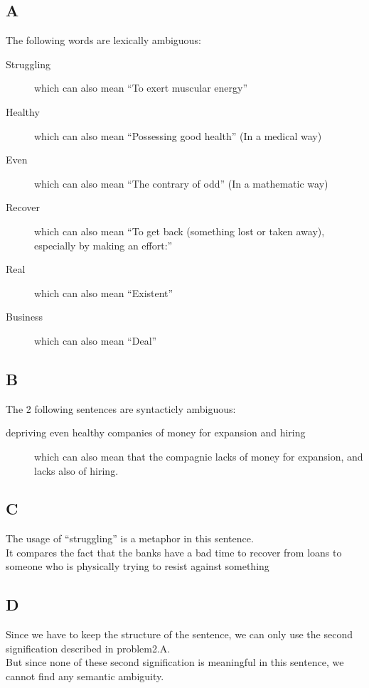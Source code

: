 \documentclass{article}
\begin{document}
        \subsection{A}
            The following words are lexically ambiguous:
            \begin{description}
                \item[Struggling] which can also mean ``To exert muscular energy''
                \item[Healthy] which can also mean ``Possessing good health'' (In a medical way)
                \item[Even] which can also mean ``The contrary of odd'' (In a mathematic way)
                \item[Recover] which can also mean ``To get back (something lost or taken away), especially by making an effort:''
                \item[Real] which can also mean ``Existent''
                \item[Business] which can also mean ``Deal''
            \end{description}
        \subsection{B}
            The 2 following sentences are syntacticly ambiguous:
            \begin{description}
                \item[depriving even healthy companies of money for expansion and hiring] which can also mean that the compagnie lacks of money for expansion, and lacks also of hiring.
            \end{description}
        \subsection{C}
            The usage of ``struggling'' is a metaphor in this sentence.\\
            It compares the fact that the banks have a bad time to recover from loans to someone who is physically trying to resist against something
        \subsection{D}
            Since we have to keep the structure of the sentence, we can only use the second signification described in problem2.A.\\
            But since none of these second signification is meaningful in this sentence, we cannot find any semantic ambiguity.
    \newpage
\end{document}
